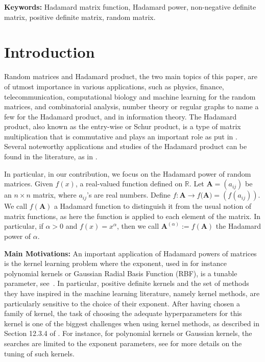 \documentclass[conference,letterpaper]{IEEEtran}
\numberwithin{equation}{section}
\begin{document}
\noindent\textbf{Keywords:} Hadamard matrix function, Hadamard power, non-negative definite matrix, positive definite matrix, random matrix.

%


\section{Introduction}
Random matrices and Hadamard product, the two main topics of this paper, are of utmost importance in various applications, such as physics, finance, telecommunication, computational biology and machine learning for the random matrices, and combinatorial analysis, number theory or regular graphs to name a few for the Hadamard product, and in information theory.
The Hadamard product, also known as the entry-wise or Schur product, is a type of matrix multiplication that is commutative and plays an important role as put in \cite{horadam2012hadamard}. 
Several noteworthy applications and studies of the Hadamard product can be found in the literature, as in \cite{hedayat1978hadamard,agaian2006hadamard,bulutoglu2009counterexample,audenaert2010spectral}.

In particular, in our contribution, we focus on the Hadamard power of random matrices. 
Given $f(x)$, a real-valued function defined on $\mathbb{R}.$ Let $\mathbf{A}=(a_{ij})$ be an $n\times n$ matrix, where $a_{ij}$'s are real numbers.  Define $f: \mathbf{A} \rightarrow f(\mathbf{A)}=(f(a_{i j}))$. We call $f(\mathbf{A})$  a Hadamard function to distinguish it from the usual notion of matrix functions, as here the function is applied to each element of the matrix. 
In particular, if $\alpha>0$ and  $f(x)=x^{\alpha}$, then we call  $\mathbf{A}^{(\alpha)}:=f(\mathbf{A})$ the Hadamard power of $\alpha$. 

\textbf{Main Motivations: }
An important application of Hadamard powers of matrices is the kernel learning problem where the exponent, used in for instance polynomial kernels or Gaussian Radial Basis Function (RBF), is a tunable parameter, see~\cite{jiang2017hadamard,li2018several, belton2019simultaneous}.
In particular, positive definite kernels and the set of methods they have inspired in the machine learning literature, namely kernel methods, are particularly sensitive to the choice of their exponent.
After having chosen a family of kernel, the task of choosing the adequate hyperparameters for this kernel is one of the biggest challenges when using kernel methods, as described in Section 12.3.4 of \cite{hastie2009elements}. 
For instance, for polynomial kernels or Gaussian kernels, the searches are limited to the exponent parameters, see \cite{bousquet2002complexity,frohlich2004feature,keerthi2007efficient} for more details on the tuning of such kernels.
\end{document}
